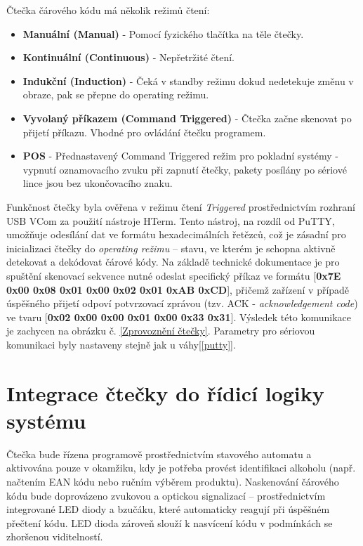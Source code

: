 \bigskip
Čtečka čárového kódu má několik režimů čtení:
\begin{itemize}
    \item \textbf{Manuální (Manual)} - Pomocí fyzického tlačítka na těle čtečky.
    \item \textbf{Kontinuální (Continuous)} - Nepřetržité čtení.
    \item \textbf{Indukční (Induction)} - Čeká v standby režimu dokud nedetekuje změnu v obraze, pak se přepne do operating režimu.
    \item \textbf{Vyvolaný příkazem (Command Triggered)} - Čtečka začne skenovat po přijetí příkazu. Vhodné pro ovládání čtečku programem.
    \item \textbf{POS} - Přednastavený Command Triggered režim pro pokladní systémy - vypnutí oznamovacího zvuku při zapnutí čtečky, pakety posílány po sériové lince jsou bez ukončovacího znaku.
\end{itemize}
\bigskip
Funkčnost čtečky byla ověřena v režimu čtení \textit{Triggered} prostřednictvím rozhraní USB VCom za použití nástroje HTerm. Tento nástroj, na rozdíl od PuTTY, umožňuje odesílání dat ve formátu hexadecimálních řetězců, což je zásadní pro inicializaci čtečky do \textit{operating režimu} – stavu, ve kterém je schopna aktivně detekovat a dekódovat čárové kódy. Na základě technické dokumentace je pro spuštění skenovací sekvence nutné odeslat specifický příkaz ve formátu [\textbf{0x7E 0x00 0x08 0x01 0x00 0x02 0x01 0xAB 0xCD}], přičemž zařízení v případě úspěšného přijetí odpoví potvrzovací zprávou (tzv. ACK - \textit{acknowledgement code}) ve tvaru [\textbf{0x02 0x00 0x00 0x01 0x00 0x33 0x31}]. Výsledek této komunikace je zachycen na obrázku č. \ref{Zprovoznění čtečky}. Parametry pro sériovou komunikaci byly nastaveny stejně jak u váhy[\ref{putty}].

\section{Integrace čtečky do řídicí logiky systému}
Čtečka bude řízena programově prostřednictvím stavového automatu a aktivována pouze v okamžiku, kdy je potřeba provést identifikaci alkoholu (např. načtením EAN kódu nebo ručním výběrem produktu). Naskenování čárového kódu bude doprovázeno zvukovou a optickou signalizací – prostřednictvím integrované LED diody a bzučáku, které automaticky reagují při úspěšném přečtení kódu. LED dioda zároveň slouží k nasvícení kódu v podmínkách se zhoršenou viditelností.

